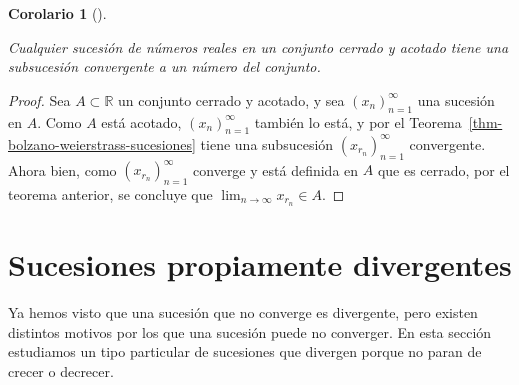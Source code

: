 \documentclass[
  a4paper,
]{scrreport}
\theoremstyle{definition}
\theoremstyle{plain}
\newtheorem{corollary}{Corolario}[chapter]
\theoremstyle{definition}
\theoremstyle{plain}
\theoremstyle{plain}
\theoremstyle{remark}
\begin{document}
\leavevmode{}%
\begin{corollary}[]\label{cor-sucesiones-conjuntos-cerrados-acotados}

Cualquier sucesión de números reales en un conjunto cerrado y acotado
tiene una subsucesión convergente a un número del conjunto.

\end{corollary}

\begin{tcolorbox}[enhanced jigsaw, breakable, arc=.35mm, colbacktitle=quarto-callout-note-color!10!white, toptitle=1mm, opacityback=0, colframe=quarto-callout-note-color-frame, colback=white, left=2mm, bottomrule=.15mm, opacitybacktitle=0.6, title=\textcolor{quarto-callout-note-color}{\faInfo}\hspace{0.5em}{Demostración}, toprule=.15mm, titlerule=0mm, coltitle=black, rightrule=.15mm, bottomtitle=1mm, leftrule=.75mm]

\begin{proof}

Sea \(A\subset \mathbb{R}\) un conjunto cerrado y acotado, y sea
\((x_n)_{n=1}^\infty\) una sucesión en \(A\). Como \(A\) está acotado,
\((x_n)_{n=1}^\infty\) también lo está, y por el
Teorema~\ref{thm-bolzano-weierstrass-sucesiones} tiene una subsucesión
\((x_{r_n})_{n=1}^\infty\) convergente. Ahora bien, como
\((x_{r_n})_{n=1}^\infty\) converge y está definida en \(A\) que es
cerrado, por el teorema anterior, se concluye que
\(\lim_{n\to\infty}x_{r_n}\in A\).

\end{proof}

\end{tcolorbox}

\hypertarget{sucesiones-propiamente-divergentes}{%
\section{Sucesiones propiamente
divergentes}\label{sucesiones-propiamente-divergentes}}

Ya hemos visto que una sucesión que no converge es divergente, pero
existen distintos motivos por los que una sucesión puede no converger.
En esta sección estudiamos un tipo particular de sucesiones que divergen
porque no paran de crecer o decrecer.
\end{document}
